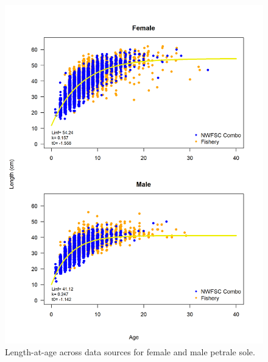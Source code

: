 \documentclass[12pt,]{article}
\begin{document}
\begin{figure}
\centering
\includegraphics{Figures/LengthAgeAll.png}
\caption{Length-at-age across data sources for female and male petrale
sole. \label{fig:length_age}}
\end{figure}
\end{document}
